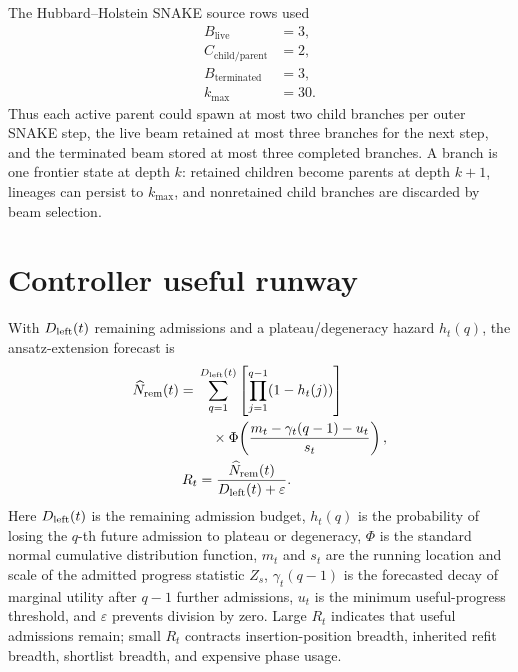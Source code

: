 \documentclass[
  reprint,
  amsmath,
  amssymb,
  aps,
  pra,
  nofootinbib,
  superscriptaddress,
  floatfix
]{revtex4-2}
\newcommand{\eps}{\varepsilon}
\begin{document}
The Hubbard--Holstein SNAKE source rows used
\[
\begin{aligned}
B_{\mathrm{live}}&=3,\\
C_{\mathrm{child/parent}}&=2,\\
B_{\mathrm{terminated}}&=3,\\
k_{\max}&=30 .
\end{aligned}
\]
Thus each active parent could spawn at most two child branches per outer SNAKE step, the live beam retained at most three branches for the next step, and the terminated beam stored at most three completed branches.  A branch is one frontier state at depth \(k\): retained children become parents at depth \(k+1\), lineages can persist to \(k_{\max}\), and nonretained child branches are discarded by beam selection.









\section{Controller useful runway}
\label{app:controller_useful_runway}

With \(D_{\rm left}(t)\) remaining admissions and a plateau/degeneracy hazard \(h_t(q)\), the ansatz-extension forecast is
\begin{equation}
\begin{aligned}
\widehat N_{\rm rem}(t)
={}&
\sum_{q=1}^{D_{\rm left}(t)}
\left[\prod_{j=1}^{q-1}(1-h_t(j))\right]
\\
&\quad\times
\Phi\!\left(\frac{m_t-\gamma_t(q-1)-u_t}{s_t}\right),
\\
R_t&=\frac{\widehat N_{\rm rem}(t)}{D_{\rm left}(t)+\eps} .
\end{aligned}
\label{eq:expected_utility_left_archival}
\end{equation}
Here \(D_{\rm left}(t)\) is the remaining admission budget, \(h_t(q)\) is the probability of losing the \(q\)-th future admission to plateau or degeneracy, \(\Phi\) is the standard normal cumulative distribution function, \(m_t\) and \(s_t\) are the running location and scale of the admitted progress statistic \(Z_s\), \(\gamma_t(q-1)\) is the forecasted decay of marginal utility after \(q-1\) further admissions, \(u_t\) is the minimum useful-progress threshold, and \(\eps\) prevents division by zero. Large \(R_t\) indicates that useful admissions remain; small \(R_t\) contracts insertion-position breadth, inherited refit breadth, shortlist breadth, and expensive phase usage.
\end{document}

